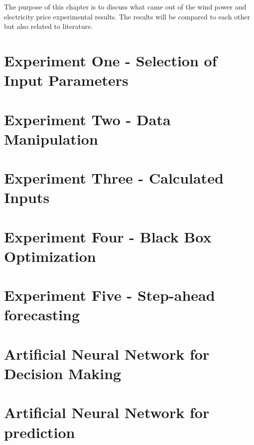 The purpose of this chapter is to discuss what came out of the wind power and electricity price experimental results. The results will be compared to each other but also related to literature.

\section{Experiment One - Selection of Input Parameters}
\label{sec:inputParameterDiscussion}

\newpage

\section{Experiment Two - Data Manipulation}
\label{sec:matrixTrimmingDiscussion}


\newpage
\section{Experiment Three - Calculated Inputs}
\label{sec:calculatedInputDiscussion}


\newpage
\section{Experiment Four - Black Box Optimization}
\label{sec:blackBoxDiscussion}


\newpage
\section{Experiment Five - Step-ahead forecasting}
\label{sec:stepAheadForecastingDiscussion}


\newpage
\section{Artificial Neural Network for Decision Making}
\label{sec:annForDecisionMaking}


\newpage
\section{Artificial Neural Network for prediction}
\label{sec:annForPrediction}


